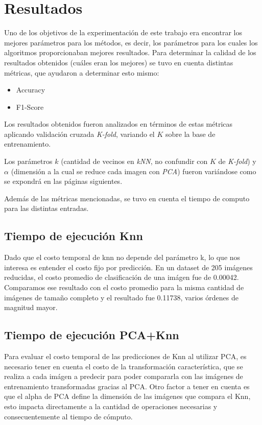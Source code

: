 \section{Resultados}

Uno de los objetivos de la experimentación de este trabajo era encontrar los mejores parámetros para los métodos, es decir, los parámetros para los cuales los algoritmos proporcionaban mejores resultados. Para determinar la calidad de los resultados obtenidos (cuáles eran los mejores) se tuvo en cuenta distintas métricas, que ayudaron a determinar esto mismo:

\begin{itemize}
\item Accuracy
\item F1-Score
\end{itemize}

Los resultados obtenidos fueron analizados en términos de estas métricas aplicando validación cruzada \textit{K-fold}, variando el $K$ sobre la base de entrenamiento.

Los parámetros $k$ (cantidad de vecinos en \textit{kNN}, no confundir con $K$ de \textit{K-fold}) y $\alpha$ (dimensión a la cual se reduce cada imagen con \textit{PCA}) fueron variándose como se expondrá en las páginas siguientes.

Además de las métricas mencionadas, se tuvo en cuenta el tiempo de computo para las distintas entradas.

\subsection{Tiempo de ejecución Knn}

Dado que el costo temporal de knn no depende del parámetro k, lo que nos interesa es entender el costo fijo por predicción. En un dataset de 205 imágenes reducidas, el costo promedio de clasificación de una imágen fue de 0.00042. Comparamos ese resultado con el costo promedio para la misma cantidad de imágenes de tamaño completo y el resultado fue 0.11738, varios órdenes de magnitud mayor. 

\subsection{Tiempo de ejecución PCA+Knn}

Para evaluar el costo temporal de las predicciones de Knn al utilizar PCA, es necesario tener en cuenta el costo de la transformación característica, que se realiza a cada imágen a predecir para poder compararla con las imágenes de entrenamiento transformadas gracias al PCA. Otro factor a tener en cuenta es que el alpha de PCA define la dimensión de las imágenes que compara el Knn, esto impacta directamente a la cantidad de operaciones necesarias y consecuentemente al tiempo de cómputo.

